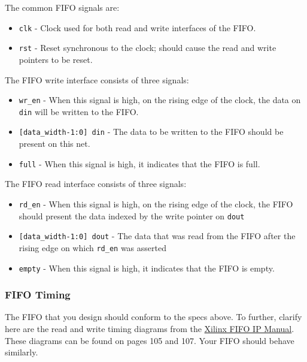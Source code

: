 \documentclass[11pt]{article}
\begin{document}
The common FIFO signals are:
\begin{itemize}
	\item \verb|clk| - Clock used for both read and write interfaces of the FIFO.
	\item \verb|rst| - Reset synchronous to the clock; should cause the read and write pointers to be reset.
\end{itemize}

The FIFO write interface consists of three signals:
\begin{itemize}
	\item \verb|wr_en| - When this signal is high, on the rising edge of the clock, the data on \verb|din| will be written to the FIFO.
	\item \verb|[data_width-1:0] din| - The data to be written to the FIFO should be present on this net.
	\item \verb|full| - When this signal is high, it indicates that the FIFO is full.
\end{itemize}

The FIFO read interface consists of three signals:
\begin{itemize}
	\item \verb|rd_en| - When this signal is high, on the rising edge of the clock, the FIFO should present the data indexed by the write pointer on \verb|dout|
	\item \verb|[data_width-1:0] dout| - The data that was read from the FIFO after the rising edge on which \verb|rd_en| was asserted
	\item \verb|empty| - When this signal is high, it indicates that the FIFO is empty.
\end{itemize}

\subsubsection*{FIFO Timing}
The FIFO that you design should conform to the specs above. To further, clarify here are the read and write timing diagrams from the \href{https://www.xilinx.com/support/documentation/ip_documentation/fifo_generator_ug175.pdf}{Xilinx FIFO IP Manual}. These diagrams can be found on pages 105 and 107. Your FIFO should behave similarly.
\end{document}
